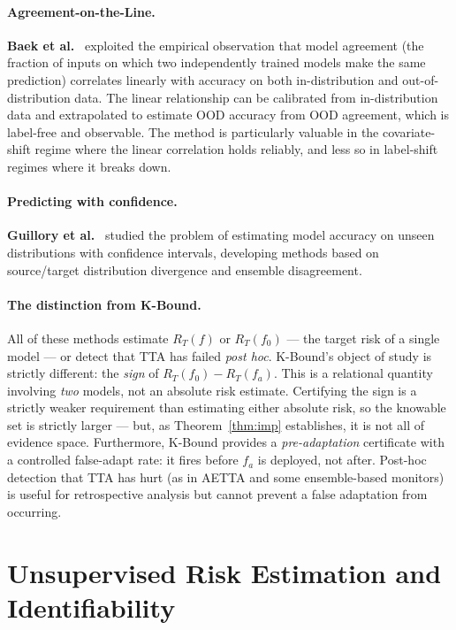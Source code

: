 \paragraph{Agreement-on-the-Line.}
\textbf{Baek et al.}~\cite{baek2022agreement} exploited the empirical
observation that model agreement (the fraction of inputs on which two
independently trained models make the same prediction) correlates linearly
with accuracy on both in-distribution and out-of-distribution data.
The linear relationship can be calibrated from in-distribution data and
extrapolated to estimate OOD accuracy from OOD agreement, which is label-free
and observable.
The method is particularly valuable in the covariate-shift regime where the
linear correlation holds reliably, and less so in label-shift regimes where
it breaks down.

\paragraph{Predicting with confidence.}
\textbf{Guillory et al.}~\cite{guillory2021predicting} studied the problem
of estimating model accuracy on unseen distributions with confidence
intervals, developing methods based on source/target distribution divergence
and ensemble disagreement.

\paragraph{The distinction from K-Bound.}
All of these methods estimate $R_T(f)$ or $R_T(f_0)$ --- the target risk of
a single model --- or detect that TTA has failed \emph{post hoc}.
K-Bound's object of study is strictly different: the \emph{sign} of
$R_T(f_0) - R_T(f_a)$.
This is a relational quantity involving \emph{two} models, not an absolute
risk estimate.
Certifying the sign is a strictly weaker requirement than estimating either
absolute risk, so the knowable set is strictly larger --- but, as
Theorem~\ref{thm:imp} establishes, it is not all of evidence space.
Furthermore, K-Bound provides a \emph{pre-adaptation} certificate with a
controlled false-adapt rate: it fires before $f_a$ is deployed, not after.
Post-hoc detection that TTA has hurt (as in AETTA and some ensemble-based
monitors) is useful for retrospective analysis but cannot prevent a false
adaptation from occurring.

\section{Unsupervised Risk Estimation and Identifiability}\label{sec:rel-ident}


